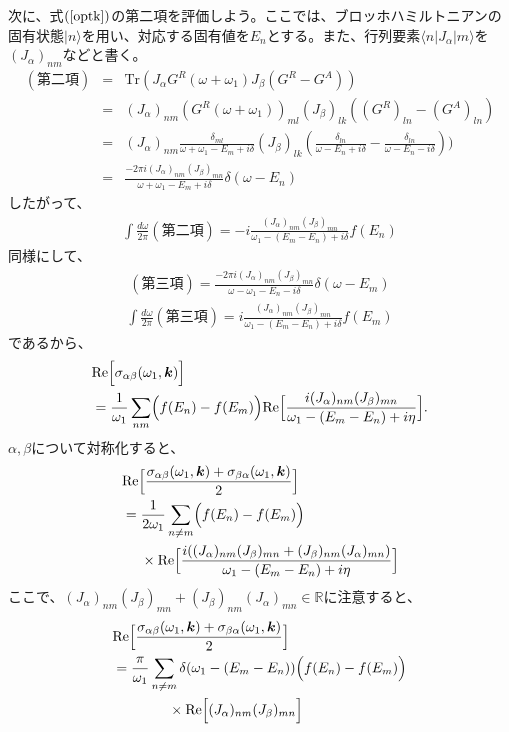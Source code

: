 \documentclass[12pt]{jsbook}
\newcommand{\la}{\langle}
\newcommand{\ra}{\rangle}
\newcommand{\R}{\mathbb{R}}
\newcommand{\ReB}[1]{\mathrm{Re}\Bigl[{#1}\Bigr]}
\newcommand{\bk}{\bm{k}}
\begin{document}
次に、式$(\ref{optk})$の第二項を評価しよう。ここでは、ブロッホハミルトニアンの固有状態$|n\ra$を用い、対応する固有値を$E_n$とする。また、行列要素$\la n| J_\alpha|m\ra$を$(J_\alpha)_{nm}$などと書く。
\begin{eqnarray}
(第二項)
&=& \mathrm{Tr}(J_\alpha G^R(\omega+\omega_1)J_\beta (G^R-G^A))\\
         &=& (J_\alpha)_{nm}(G^R(\omega+\omega_1))_{ml}(J_\beta)_{lk}((G^R)_{ln}-(G^A)_{ln})\\
         &=& (J_\alpha)_{nm}\frac{\delta_{ml}}{\omega + \omega_1 - E_m + i\delta}(J_\beta)_{lk}(\frac{\delta_{ln}}{\omega - E_n + i\delta}-\frac{\delta_{ln}}{\omega - E_n - i\delta}))\\
         &=&\frac{-2\pi i (J_\alpha)_{nm}(J_\beta)_{mn}}{\omega + \omega_1 -E_m + i\delta}\delta(\omega - E_n)
\end{eqnarray}
したがって、
\begin{eqnarray}
\int \frac{d\omega}{2\pi}(第二項) = -i\frac{(J_\alpha)_{nm}(J_\beta)_{mn}}{\omega_1-(E_m-E_n)+i\delta}f(E_n)
\end{eqnarray}
同様にして、
\begin{eqnarray}
(第三項) = \frac{-2\pi i (J_\alpha)_{nm}(J_\beta)_{mn}}{\omega - \omega_1 -E_n - i\delta}\delta(\omega - E_m)
\end{eqnarray}
\begin{eqnarray}
\int \frac{d\omega}{2\pi}(第三項) = i\frac{(J_\alpha)_{nm}(J_\beta)_{mn}}{\omega_1-(E_m-E_n)+i\delta}f(E_m)
\end{eqnarray}
であるから、
\begin{align}
&\ReB{\sigma_{\alpha\beta}(\omega_1,\bk)}\nonumber\\
&=  \frac{1}{\omega_1}\sum_{nm}\Bigl(f(E_n)-f(E_m)\Bigr)\mathrm{Re}\Bigl[\frac{i(J_\alpha)_{nm}(J_\beta)_{mn}}{\omega_1-(E_m-E_n) + i\eta}\Bigr].
\end{align}
$\alpha,\beta$について対称化すると、
\begin{align}
&\ReB{\frac{\sigma_{\alpha\beta}(\omega_1,\bk) + \sigma_{\beta \alpha}(\omega_1,\bk)}{2}}\nonumber\\
&= \frac{1}{2\omega_1}\sum_{n\neq m}\Bigl(f(E_n)-f(E_m)\Bigr)\nonumber\\
& \ \ \ \ \times\mathrm{Re}\Bigl[\frac{i((J_\alpha)_{nm}(J_\beta)_{mn}+(J_\beta )_{nm}(J_\alpha)_{mn})}{\omega_1-(E_m-E_n) + i\eta}\Bigr]
\end{align}
ここで、$(J_\alpha)_{nm}(J_\beta)_{mn}+(J_\beta )_{nm}(J_\alpha)_{mn}\in \R$に注意すると、
\begin{align}
&\ReB{\frac{\sigma_{\alpha\beta}(\omega_1,\bk) + \sigma_{\beta \alpha}(\omega_1,\bk)}{2}}\nonumber\\
&=\frac{\pi }{\omega_1}\sum_{n\neq m} \delta(\omega_1-(E_m-E_n))\Bigl(f(E_n)-f(E_m)\Bigr)\nonumber\\
& \ \ \ \ \ \ \ \ \ \ \ \ \label{fnfm}\times\ReB{(J_\alpha)_{nm}(J_\beta)_{mn}}
\end{align}
\end{document}
